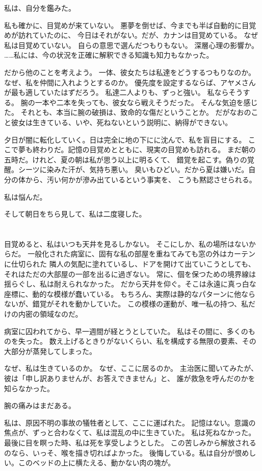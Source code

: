 \documentclass[../IHMain]{subfiles}
\begin{document}
私は、自分を鑑みた。

私も確かに、目覚めが来ていない。
悪夢を倒せば、今までも半ば自動的に目覚めが訪れていたのに、
今日はそれがない。だが、カナンは目覚めている。
なぜ私は目覚めていない。
自らの意思で選んだつもりもない。
深層心理の影響か。
……私には、今の状況を正確に解釈できる知識も知力もなかった。

だから他のことを考えよう。
一体、彼女たちは私達をどうするつもりなのか。
なぜ、私を仲間に入れようとするのか。
優先度を設定するならば、アヤメさんが最も適していたはずだろう。
私達二人よりも、ずっと強い。
私ならそうする。
腕の一本や二本を失っても、彼女なら戦えそうだった。
そんな気迫を感じた。
それとも、本当に腕の破損は、致命的な傷だということか。
だがなおのこと彼女は生きている、いや、死ねないという説明に、納得ができない。

夕日が闇に転化していく。日は完全に地の下にに沈んで、私を盲目にする。
ここで夢も終わりだ。記憶の目覚めとともに、現実の目覚めも訪れる。
まだ朝の五時だ。けれど、夏の朝は私が思う以上に明るくて、
錯覚を起こす。偽りの覚醒。シーツに染みた汗が、気持ち悪い。
臭いもひどい。だから夏は嫌いだ。自分の体から、汚い何かが滲み出ているという事実を、
こうも黙認させられる。

私は悩んだ。

そして朝日をちら見して、私は二度寝した。

\section{}
目覚めると、私はいつも天井を見るしかない。
そこにしか、私の場所はないからだ。
一般化された病室に、固有な私の部屋を重ねてみても窓の外はカーテンに仕切られた
隣人の気配に塗れているし、ドアを開けて出ていこうとしても、
それはただの大部屋の一部を出るに過ぎない。
常に、個を保つための境界線は揺らぐし、私は耐えられなかった。
だから天井を仰ぐ。そこは永遠に真っ白な座標に、動的な模様が蠢いている。
もちろん、実際は静的なパターンに他ならないが、錯覚がそれを動かしていた。
この模様の運動が、唯一私の持つ、私だけの内密の領域なのだ。

病室に囚われてから、早一週間が経とうとしていた。
私はその間に、多くのものを失った。
数え上げるときりがないくらい、私を構成する無限の要素、その大部分が蒸発してしまった。

なぜ、私は生きているのか。
なぜ、ここに居るのか。
主治医に聞いてみたが、彼は「申し訳ありませんが、お答えできません」と、
誰が救急を呼んだのかを知らなかった。

腕の痛みはまだある。

私は、原因不明の事故の犠牲者として、ここに運ばれた。
記憶はない。意識の焦点が、ずっと合わなくて、私は混乱の中に生きていた。
私は死ねなかった。最後に目を瞑った時、私は死を享受しようとした。
この苦しみから解放されるのなら、いっそ、喉を描き切ればよかった。
後悔している。私は自分が恨めしい。このベッドの上に横たえる、動かない肉の塊が。
\end{document}
